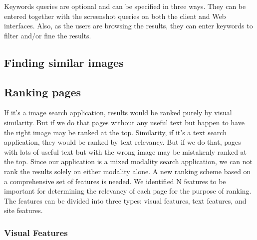 \documentclass{www2010-submission}
\begin{document}
Keywords queries are optional and can be specified in three ways.
They can be entered together with the screenshot queries on both
the client and Web interfaces. Also, as the users are browsing the
results, they can enter keywords to filter and/or fine the
results.



\subsection{Finding similar images}


\subsection{Ranking pages}

If it's a image search application, results would be ranked purely
by visual similarity. But if we do that pages without any useful
text but happen to have the right image may be ranked at the top.
Similarity, if it's a text search application, they would be
ranked by text relevancy. But if we do that, pages with lots of
useful text but with the wrong image may be mistakenly ranked at
the top. Since our application is a mixed modality search
application, we can not rank the results solely on either modality
alone. A new ranking scheme based on a comprehensive set of
features is needed. We identified N features to be important for
determining the relevancy of each page for the purpose of ranking.
The features can be divided into three types: visual features,
text features, and site features.

\subsubsection{Visual Features}
\end{document}
